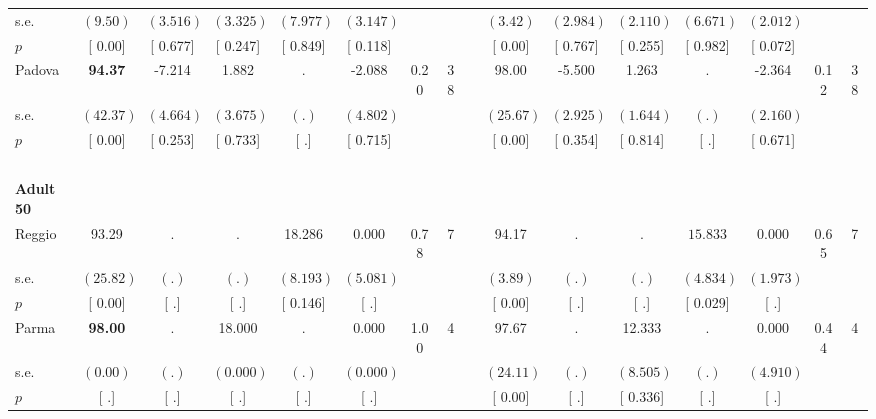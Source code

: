 \begin{longtable}{L{8em} c c c c c c c p{1em} c c c c c c c}
\quad \quad \quad \quad s.e.& $ (     9.50)$ & $ (    3.516)$ & $ (    3.325)$ & $ (    7.977)$ & $ (    3.147)$ & & & & $ (     3.42)$ & $ (    2.984)$ & $ (    2.110)$ & $ (    6.671)$ & $ (    2.012)$ & &  \\*
\quad \quad \quad \quad $ p$ & [     0.00] & [    0.677] & [    0.247] & [    0.849] & [    0.118] & & & & [     0.00] & [    0.767] & [    0.255] & [    0.982] & [    0.072] & &  \\[1em]
\quad \quad \quad Padova& \textbf{    94.37} &    -7.214 &     1.882 &         . &    -2.088 &      0.20 &        38 & & 98.00 &    -5.500 &     1.263 &         . &    -2.364 &      0.12 &        38  \\*
\quad \quad \quad \quad s.e.& $ (    42.37)$ & $ (    4.664)$ & $ (    3.675)$ & $ (        .)$ & $ (    4.802)$ & & & & $ (    25.67)$ & $ (    2.925)$ & $ (    1.644)$ & $ (        .)$ & $ (    2.160)$ & &  \\*
\quad \quad \quad \quad $ p$ & [     0.00] & [    0.253] & [    0.733] & [        .] & [    0.715] & & & & [     0.00] & [    0.354] & [    0.814] & [        .] & [    0.671] & &  \\[1em]
~\\[1em]
\quad \quad \textbf{Adult 50} & & & & & & & & & & & & & & & \\* 
\quad \quad \quad Reggio& 93.29 &         . &         . &    18.286 &     0.000 &      0.78 &         7 & & 94.17 &         . &         . & $ \mathbf{   15.833}$ &     0.000 &      0.65 &         7  \\*
\quad \quad \quad \quad s.e.& $ (    25.82)$ & $ (        .)$ & $ (        .)$ & $ (    8.193)$ & $ (    5.081)$ & & & & $ (     3.89)$ & $ (        .)$ & $ (        .)$ & $ (    4.834)$ & $ (    1.973)$ & &  \\*
\quad \quad \quad \quad $ p$ & [     0.00] & [        .] & [        .] & [    0.146] & [        .] & & & & [     0.00] & [        .] & [        .] & [    0.029] & [        .] & &  \\[1em]
\quad \quad \quad Parma& \textbf{    98.00} &         . &    18.000 &         . &     0.000 &      1.00 &         4 & & 97.67 &         . &    12.333 &         . &     0.000 &      0.44 &         4  \\*
\quad \quad \quad \quad s.e.& $ (     0.00)$ & $ (        .)$ & $ (    0.000)$ & $ (        .)$ & $ (    0.000)$ & & & & $ (    24.11)$ & $ (        .)$ & $ (    8.505)$ & $ (        .)$ & $ (    4.910)$ & &  \\*
\quad \quad \quad \quad $ p$ & [        .] & [        .] & [        .] & [        .] & [        .] & & & & [     0.00] & [        .] & [    0.336] & [        .] & [        .] & &  \\[1em]

\end{longtable}
